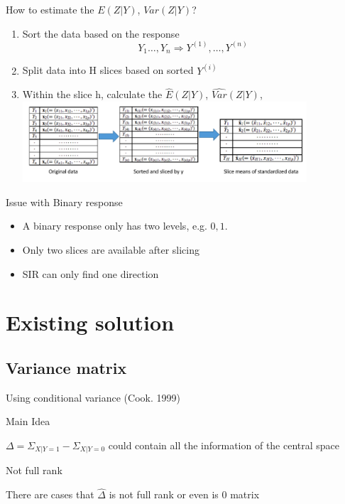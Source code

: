 \documentclass[ignorenonframetext,]{beamer}
\providecommand{\tightlist}{%
  \setlength{\itemsep}{0pt}\setlength{\parskip}{0pt}}
\begin{document}
\begin{frame}{How to estimate the \(E(Z|Y)\), \(Var(Z|Y)\)?}

\begin{enumerate}
\def\labelenumi{\arabic{enumi}.}
\tightlist
\item
  Sort the data based on the response \[
    Y_1 \dots, Y_n \Rightarrow Y^{(1)},\dots,Y^{(n)} 
  \]
\item
  Split data into H slices based on sorted \(Y^{(i)}\)
\item
  Within the slice h, calculate the \(\hat{E}(Z|Y)\),
  \(\hat{Var}(Z|Y)\),
  \includegraphics[width=4.16667in]{./pic/slice method.png}
\end{enumerate}

\end{frame}

\begin{frame}{Issue with Binary response}

\begin{itemize}
\item
  A binary response only has two levels, e.g. \(0,1\).
\item
  Only two slices are available after slicing
\item
  SIR can only find one direction
\end{itemize}

\end{frame}

\section{Existing solution}\label{existing-solution}

\subsection{Variance matrix}\label{variance-matrix}

\begin{frame}{Using conditional variance (Cook. 1999)}

\begin{block}{Main Idea}

\(\Delta = \Sigma_{X|Y = 1} - \Sigma_{X|Y = 0}\) could contain all the
information of the central space

\end{block}

\begin{block}{Not full rank}

There are cases that \(\hat \Delta\) is not full rank or even is 0
matrix

\end{block}

\end{frame}
\end{document}
